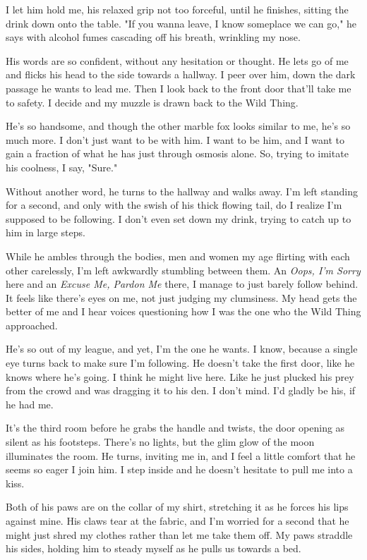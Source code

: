 I let him hold me, his relaxed grip not too forceful, until he finishes, sitting the drink down onto the table. "If you wanna leave, I know someplace we can go," he says with alcohol fumes cascading off his breath, wrinkling my nose.

His words are so confident, without any hesitation or thought. He lets go of me and flicks his head to the side towards a hallway. I peer over him, down the dark passage he wants to lead me. Then I look back to the front door that'll take me to safety. I decide and my muzzle is drawn back to the Wild Thing.

He's so handsome, and though the other marble fox looks similar to me, he's so much more. I don't just want to be with him. I want to be him, and I want to gain a fraction of what he has just through osmosis alone. So, trying to imitate his coolness, I say, "Sure."

Without another word, he turns to the hallway and walks away. I'm left standing for a second, and only with the swish of his thick flowing tail, do I realize I'm supposed to be following. I don't even set down my drink, trying to catch up to him in large steps.

While he ambles through the bodies, men and women my age flirting with each other carelessly, I'm left awkwardly stumbling between them. An \emph{Oops, I'm Sorry} here and an \emph{Excuse Me, Pardon Me} there, I manage to just barely follow behind. It feels like there's eyes on me, not just judging my clumsiness. My head gets the better of me and I hear voices questioning how I was the one who the Wild Thing approached.

He's so out of my league, and yet, I'm the one he wants. I know, because a single eye turns back to make sure I'm following. He doesn't take the first door, like he knows where he's going. I think he might live here. Like he just plucked his prey from the crowd and was dragging it to his den. I don't mind. I'd gladly be his, if he had me.

It's the third room before he grabs the handle and twists, the door opening as silent as his footsteps. There's no lights, but the glim glow of the moon illuminates the room. He turns, inviting me in, and I feel a little comfort that he seems so eager I join him. I step inside and he doesn't hesitate to pull me into a kiss.

Both of his paws are on the collar of my shirt, stretching it as he forces his lips against mine. His claws tear at the fabric, and I'm worried for a second that he might just shred my clothes rather than let me take them off. My paws straddle his sides, holding him to steady myself as he pulls us towards a bed.

